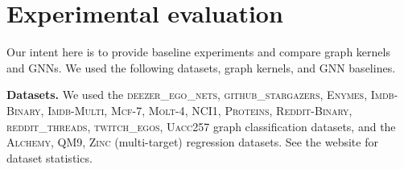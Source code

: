 \documentclass{article}
\newcommand{\xhdr}[1]{{\noindent\bfseries #1}}
\theoremstyle{definition}
\begin{document}
\begin{table}[]\centering	
	\caption{Mean MAE (mean std. MAE, logMAE) on large-scale (multi-target) molecular regression tasks.\label{neural_short_tt}}
\end{table}		
\section{Experimental evaluation}

Our intent here is to provide baseline experiments and compare graph kernels and GNNs. We used the following datasets, graph kernels, and GNN baselines.

\xhdr{Datasets.} We used the \textsc{deezer\_ego\_nets}, \textsc{github\_stargazers}, \textsc{Enymes}, \textsc{Imdb-Binary}, \textsc{Imdb-Multi}, \textsc{Mcf-7}, \textsc{Molt-4},    \textsc{NCI1}, \textsc{Proteins},
\textsc{Reddit-Binary},    \textsc{reddit\_threads}, \textsc{twitch\_egos}, \textsc{Uacc257} graph classification datasets, and the \textsc{Alchemy}, \textsc{QM9}, \textsc{Zinc} (multi-target) regression datasets. See the website for dataset statistics.
\end{document}
